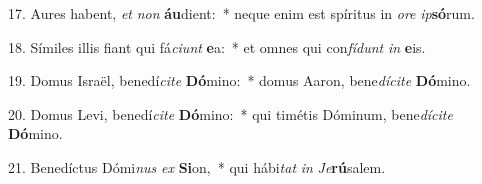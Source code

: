 17. Aures habent, \textit{et} \textit{non} \textbf{áu}dient:~*  neque enim est spíritus in \textit{o}\textit{re} \textit{ip}\textbf{só}rum.\

18. Símiles illis fiant qui fá\textit{ci}\textit{unt} \textbf{e}a:~*  et omnes qui con\textit{fí}\textit{dunt} \textit{in} \textbf{e}is.\

19. Domus Israël, benedí\textit{ci}\textit{te} \textbf{Dó}mino:~*  domus Aaron, bene\textit{dí}\textit{ci}\textit{te} \textbf{Dó}mino.\

20. Domus Levi, benedí\textit{ci}\textit{te} \textbf{Dó}mino:~*  qui timétis Dóminum, bene\textit{dí}\textit{ci}\textit{te} \textbf{Dó}mino.\

21. Benedíctus Dómi\textit{nus} \textit{ex} \textbf{Si}on,~*  qui hábi\textit{tat} \textit{in} \textit{Je}\textbf{rú}salem.\

